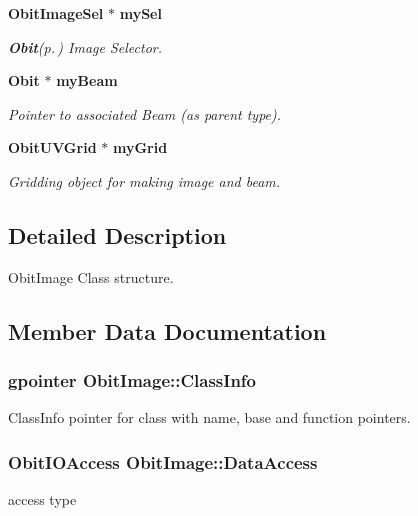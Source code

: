 \begin{CompactItemize}
{\bf Obit\-Image\-Sel} $\ast$ {\bf my\-Sel}
\begin{CompactList}\small\item\em {\bf Obit}{\rm (p.\,\pageref{structObit})} Image Selector. \item\end{CompactList}\item 
{\bf Obit} $\ast$ {\bf my\-Beam}
\begin{CompactList}\small\item\em Pointer to associated Beam (as parent type). \item\end{CompactList}\item 
{\bf Obit\-UVGrid} $\ast$ {\bf my\-Grid}
\begin{CompactList}\small\item\em Gridding object for making image and beam. \item\end{CompactList}\end{CompactItemize}


\subsection{Detailed Description}
Obit\-Image Class structure. 



\subsection{Member Data Documentation}
\subsubsection{\setlength{\rightskip}{0pt plus 5cm}gpointer {\bf Obit\-Image::Class\-Info}}\label{structObitImage_o1}


Class\-Info pointer for class with name, base and function pointers. 

\subsubsection{\setlength{\rightskip}{0pt plus 5cm}Obit\-IOAccess {\bf Obit\-Image::Data\-Access}}\label{structObitImage_o7}


access type 

